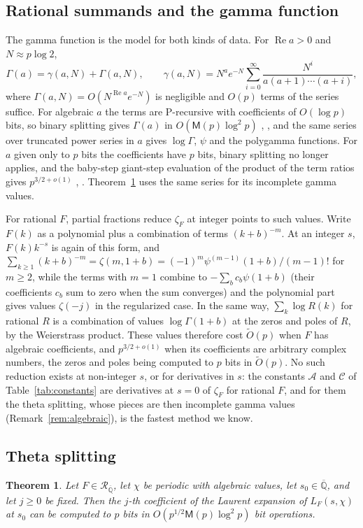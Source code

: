 \documentclass[11pt,reqno]{amsart}
\newtheorem{theorem}{Theorem}[section]
\theoremstyle{definition}
\theoremstyle{remark}
\newcommand{\Qbar}{\overline{\mathbb{Q}}}
\newcommand{\RegQ}{\mathcal{R}_{\Qbar}}
\newcommand{\Mul}{\mathsf{M}}
\begin{document}
\subsection{Rational summands and the gamma function}\label{sec:rational}
The gamma function is the model for both kinds of data. For $\operatorname{Re}a > 0$ and $N \approx p\log2$,
\[
  \Gamma(a) = \gamma(a,N) + \Gamma(a,N), \qquad \gamma(a,N) = N^ae^{-N}\sum_{i=0}^{\infty}\frac{N^i}{a(a+1)\cdots(a+i)},
\]
where $\Gamma(a,N) = O(N^{\operatorname{Re}a}e^{-N})$ is negligible and $O(p)$ terms of the series suffice. For
algebraic $a$ the terms are P-recursive with coefficients of $O(\log p)$ bits, so binary splitting gives $\Gamma(a)$ in
$O(\Mul(p)\log^2p)$ \cite[Chapter~10]{BB87}, \cite{BB88,Bor87,BZ10,Joh23}, and the same series over truncated power series in $a$ gives $\log\Gamma$, $\psi$ and
the polygamma functions. For $a$ given only to $p$ bits the coefficients have $p$ bits, binary splitting no longer
applies, and the baby-step giant-step evaluation of the product of the term ratios gives $p^{3/2+o(1)}$
\cite[Chapter~10]{BB87}, \cite{BB88,Bor87,CC90,Joh23}. Theorem~\ref{thm:complexity} uses the same series for its incomplete gamma values.

For rational $F$, partial fractions reduce $\zeta_F$ at integer points to such values. Write $F(k)$ as a polynomial plus
a combination of terms $(k+b)^{-m}$. At an integer $s$, $F(k)k^{-s}$ is again of this form, and
$\sum_{k\ge1}(k+b)^{-m} = \zeta(m, 1+b) = (-1)^m\psi^{(m-1)}(1+b)/(m-1)!$ for $m \ge 2$, while the terms with $m = 1$
combine to $-\sum_bc_b\psi(1+b)$ (their coefficients $c_b$ sum to zero when the sum converges) and the polynomial part
gives values $\zeta(-j)$ in the regularized case. In the same way, $\sum_k\log R(k)$ for rational $R$ is a combination
of values $\log\Gamma(1+b)$ at the zeros and poles of $R$, by the Weierstrass product. These values therefore cost
$\widetilde O(p)$ when $F$ has algebraic coefficients, and $p^{3/2+o(1)}$ when its coefficients are arbitrary complex
numbers, the zeros and poles being computed to $p$ bits in $\widetilde O(p)$. No such reduction exists at
non-integer $s$, or for derivatives in $s$: the constants $\mathcal A$ and $\mathcal C$ of Table~\ref{tab:constants} are
derivatives at $s = 0$ of $\zeta_F$ for rational $F$, and for them the theta splitting, whose pieces are then incomplete
gamma values (Remark~\ref{rem:algebraic}), is the fastest method we know.

\subsection{Theta splitting}
\begin{theorem}\label{thm:complexity}
Let $F \in \RegQ$, let $\chi$ be periodic with algebraic values, let $s_0 \in \Qbar$, and let
$j \ge 0$ be fixed. Then the $j$-th coefficient of the Laurent expansion of $L_F(s,\chi)$ at $s_0$ can be computed to
$p$ bits in $O(p^{1/2}\Mul(p)\log^2 p)$ bit operations.
\end{theorem}
\end{document}
